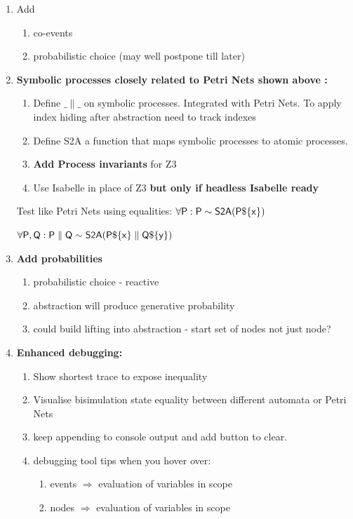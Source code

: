 \documentclass[]{article}
\begin{document}
\begin{enumerate}






\item Add 
\begin{enumerate}
\item co-events
\item probabilistic choice (may well postpone till later)
\end{enumerate}



\item {\bf Symbolic processes closely related to Petri Nets shown above :}
\begin{enumerate}
\item Define $\_\parallel\_$ on symbolic processes.  Integrated with Petri Nets. To  apply index hiding  after abstraction need to track indexes

\item Define {\sf S2A} a function that maps symbolic processes to atomic processes.

\item {\bf Add Process invariants} for Z3

\item Use Isabelle in place of Z3  {\bf but only if headless Isabelle ready}
\end{enumerate}
Test like Petri Nets using equalities: $\sf \forall {\sf P} : P  \sim  S2A(P\$\{x\})$

$\sf \forall {\sf P, Q} : P\parallel Q  \sim  S2A(P\$\{x\}\parallel Q\$\{y\})$




\item {\bf Add probabilities}
\begin{enumerate}
\item probabilistic choice - reactive
\item abstraction will produce generative probability
\item could build  lifting into abstraction - start set of nodes  not just node?
\end{enumerate}
\item {\bf Enhanced  debugging:}
 \begin{enumerate}
 \item Show shortest trace to expose inequality
  \item Visualise bisimulation  state equality between different automata or Petri Nets
 \item  keep appending to console output and add button to clear.
\item debugging tool tips when you hover over:
 \begin{enumerate}
 \item events $\Rightarrow$ evaluation of variables in scope
 \item  nodes $\Rightarrow$ evaluation of variables in scope
 \end{enumerate}


\end{enumerate}
\end{enumerate}
\end{document}
